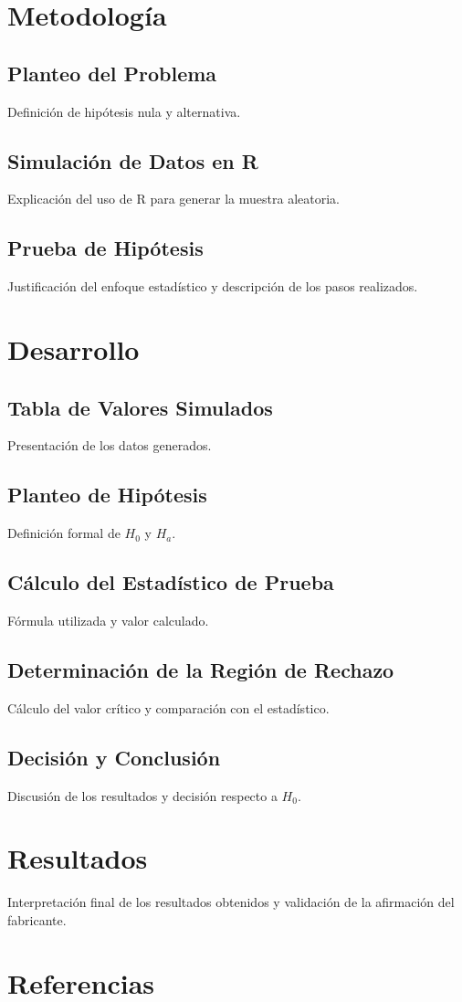 \documentclass[a4paper,12pt]{article}
\begin{document}
\section{Metodología}
\subsection{Planteo del Problema}
Definición de hipótesis nula y alternativa.
\subsection{Simulación de Datos en R}
Explicación del uso de R para generar la muestra aleatoria.
\subsection{Prueba de Hipótesis}
Justificación del enfoque estadístico y descripción de los pasos realizados.

\section{Desarrollo}
\subsection{Tabla de Valores Simulados}
Presentación de los datos generados.
\subsection{Planteo de Hipótesis}
Definición formal de \( H_0 \) y \( H_a \).
\subsection{Cálculo del Estadístico de Prueba}
Fórmula utilizada y valor calculado.
\subsection{Determinación de la Región de Rechazo}
Cálculo del valor crítico y comparación con el estadístico.
\subsection{Decisión y Conclusión}
Discusión de los resultados y decisión respecto a \( H_0 \).

\section{Resultados}
Interpretación final de los resultados obtenidos y validación de la afirmación del fabricante.

\section{Referencias}
\printbibliography
\end{document}
